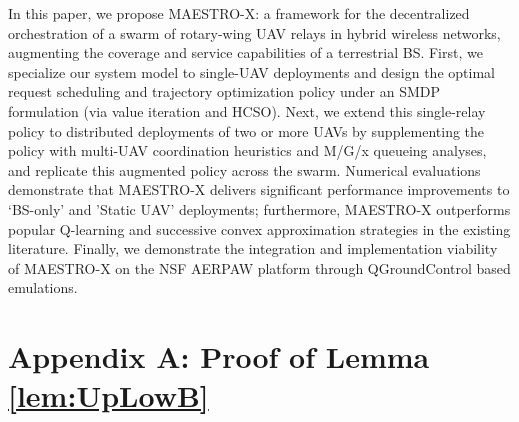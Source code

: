 \documentclass[12pt, draftcls, onecolumn]{IEEEtran}
\theoremstyle{plain}
\theoremstyle{definition}
\theoremstyle{remark}
\begin{document}
In this paper, we propose MAESTRO-X: a framework for the decentralized orchestration of a swarm of rotary-wing UAV relays in hybrid wireless networks, augmenting the coverage and service capabilities of a terrestrial BS. First, we specialize our system model to single-UAV deployments and design the optimal request scheduling and trajectory optimization policy under an SMDP formulation (via value iteration and HCSO). Next, we extend this single-relay policy to distributed deployments of two or more UAVs by supplementing the policy with multi-UAV coordination heuristics and M/G/x queueing analyses, and replicate this augmented policy across the swarm. Numerical evaluations demonstrate that MAESTRO-X delivers significant performance improvements to `BS-only' and 'Static UAV' deployments; furthermore, MAESTRO-X outperforms popular Q-learning and successive convex approximation strategies in the existing literature. Finally, we demonstrate the integration and implementation viability of MAESTRO-X on the NSF AERPAW platform through QGroundControl based emulations.
\vspace{-4mm}


\appendices



\section*{Appendix A: Proof of Lemma \ref{lem:UpLowB}}\label{AA}
\vspace{-2mm}
\end{document}
